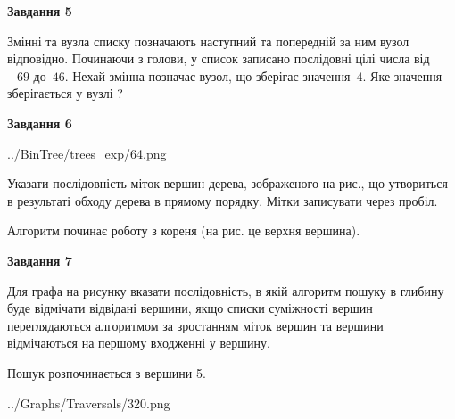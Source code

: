 \documentclass[12pt, ukrainian]{article}
\begin{document}
{\begin {large}
{\begin {center}\textbf{Завдання 5}\end {center}}\par
Змінні  та  вузла списку позначають наступний та попередній за ним вузол відповідно. Починаючи з голови, у список записано послідовні цілі числа від~$-69$ до~$46$. Нехай змінна  позначає вузол, що зберігає значення~$4$.
Яке значення зберігається у вузлі  ?\par
\newpage

{\begin {center}\textbf{Завдання 6}\end {center}}\par

\begin{center}
	{../BinTree/trees_exp/64.png}
\end{center}
Указати послідовність міток вершин дерева, зображеного на рис., що утвориться в результаті обходу дерева в прямому порядку. Мітки записувати через пробіл.\par Алгоритм починає роботу з кореня (на рис. це верхня вершина).\par
\newpage

{\begin {center}\textbf{Завдання 7}\end {center}}\par
Для графа на рисунку вказати послідовність, в якій алгоритм пошуку в глибину буде відмічати відвідані вершини, якщо списки суміжності вершин переглядаються алгоритмом за зростанням міток вершин та вершини відмічаються на першому вход\-женні у вершину.\par
Пошук розпочинається з вершини 5.\par

\begin{center}
	{../Graphs/Traversals/320.png}
\end{center}\par
\newpage


\end{large}}
\end{document}
